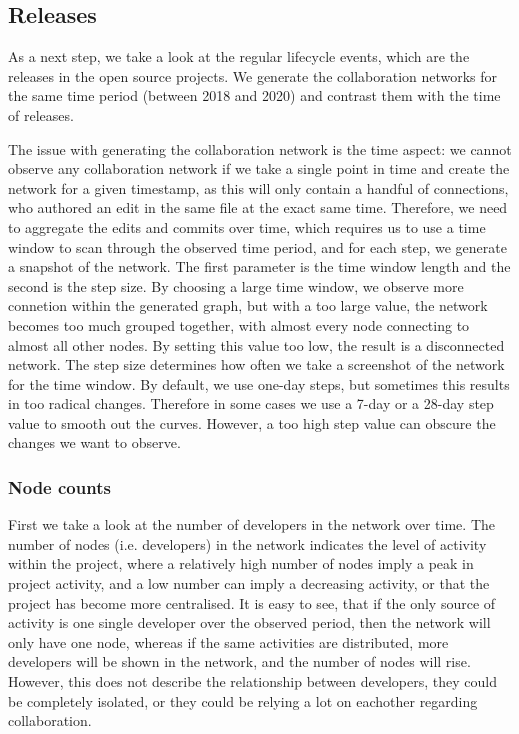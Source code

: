 \subsection{Releases}
\label{sec:releases}
As a next step, we take a look at the regular lifecycle events, which are the releases in the open source projects. We generate the collaboration networks for the same time period (between 2018 and 2020) and contrast them with the time of releases.

The issue with generating the collaboration network is the time aspect: we cannot observe any collaboration network if we take a single point in time and create the network for a given timestamp, as this will only contain a handful of connections, who authored an edit in the same file at the exact same time. Therefore, we need to aggregate the edits and commits over time, which requires us to use a time window to scan through the observed time period, and for each step, we generate a snapshot of the network. The first parameter is the time window length and the second is the step size. By choosing a large time window, we observe more connetion within the generated graph, but with a too large value, the network becomes too much grouped together, with almost every node connecting to almost all other nodes. By setting this value too low, the result is a disconnected network. The step size determines how often we take a screenshot of the network for the time window. By default, we use one-day steps, but sometimes this results in too radical changes. Therefore in some cases we use a 7-day or a 28-day step value to smooth out the curves. However, a too high step value can obscure the changes we want to observe.

\subsubsection{Node counts}

First we take a look at the number of developers in the network over time. The number of nodes (i.e. developers) in the network indicates the level of activity within the project, where a relatively high number of nodes imply a peak in project activity, and a low number can imply a decreasing activity, or that the project has become more centralised. It is easy to see, that if the only source of activity is one single developer over the observed period, then the network will only have one node, whereas if the same activities are distributed, more developers will be shown in the network, and the number of nodes will rise. However, this does not describe the relationship between developers, they could be completely isolated, or they could be relying a lot on eachother regarding collaboration.

